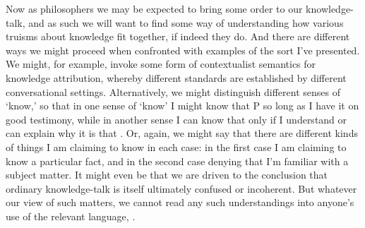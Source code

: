 \documentclass[11pt,letterpaper,oneside]{amsart} %
\begin{document}






Now as philosophers we may be expected to bring some order to our knowledge-talk, and as such we will want to find some way of understanding how various truisms about knowledge fit together, if indeed they do. And there are different ways we might proceed when confronted with examples of the sort I've presented. We might, for example, invoke some form of contextualist semantics for knowledge attribution, whereby different standards are established by different conversational settings. Alternatively, we might distinguish different senses of `know,' so that in one sense of `know' I might know that P so long as I have it on good testimony, while in another sense I can know that  only if I understand or can explain why it is that . Or, again, we might say that there are different kinds of things I am claiming to know in each case: in the first case I am claiming to know a particular fact, and in the second case denying that I'm familiar with a subject matter. It might even be that we are driven to the conclusion that ordinary knowledge-talk is itself ultimately confused or incoherent. But whatever our view of such matters, we cannot read any such understandings into anyone's use of the relevant language, .
\end{document}
